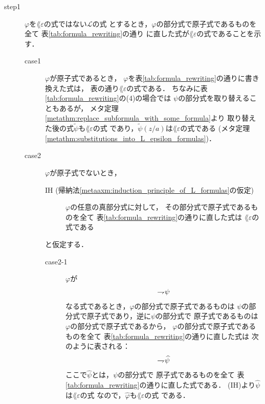 	\begin{metaprf}\mbox{}
		\begin{description}
			\item[step1] $\varphi$を$\lang{\varepsilon}$の式ではない$\mathcal{L}$の式
				とするとき，$\varphi$の部分式で原子式であるものを全て
				表\ref{tab:formula_rewriting}の通り
				に直した式が$\lang{\varepsilon}$の式であることを示す．
				\begin{description}
					\item[case1] $\varphi$が原子式であるとき，
						$\varphi$を表\ref{tab:formula_rewriting}の通りに書き換えた式は，
						表の通り$\lang{\varepsilon}$の式である．
						ちなみに表\ref{tab:formula_rewriting}の(4)の場合では
						$\psi$の部分式を取り替えることもあるが，
						メタ定理\ref{metathm:replace_subformula_with_some_formula}より
						取り替えた後の式$\widetilde{\psi}$も$\lang{\varepsilon}$の式
						であり，$\widetilde{\psi}(z/a)$は$\lang{\varepsilon}$の式である
						(メタ定理\ref{metathm:substitutions_into_L_epsilon_formulas})．
						
					\item[case2] $\varphi$が原子式でないとき，
						\begin{description}
							\item[IH (帰納法\ref{metaaxm:induction_principle_of_L_formulas}の仮定)]
								$\varphi$の任意の真部分式に対して，
								その部分式で原子式であるものを全て
								表\ref{tab:formula_rewriting}の通りに直した式は
								$\lang{\varepsilon}$の式である
						\end{description}
						と仮定する．
						\begin{description}
							\item[case2-1] $\varphi$が
								\begin{align}
									\rightharpoondown\hspace{-0.25em} \psi
								\end{align}
								なる式であるとき，$\varphi$の部分式で原子式であるものは
								$\psi$の部分式で原子式であり，逆に$\psi$の部分式で
								原子式であるものは$\varphi$の部分式で原子式であるから，
								$\varphi$の部分式で原子式であるものを全て
								表\ref{tab:formula_rewriting}の通りに直した式は
								次のように表される：
								\begin{align}
									\rightharpoondown\hspace{-0.25em} \widehat{\psi}
								\end{align}
								ここで$\widehat{\psi}$とは，$\psi$の部分式で
								原子式であるものを全て
								表\ref{tab:formula_rewriting}の通りに直した式である．
								(IH)より$\widehat{\psi}$は$\lang{\varepsilon}$の式
								なので，$\widehat{\varphi}$も$\lang{\varepsilon}$の式
								である．
								

\end{description}
\end{description}
\end{description}
\end{metaprf}
